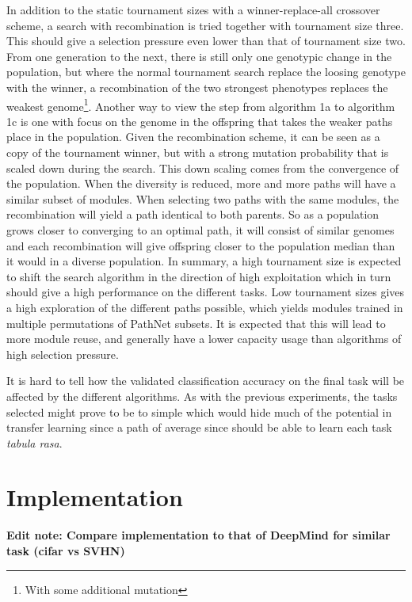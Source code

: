 In addition to the static tournament sizes with a winner-replace-all crossover scheme, a search with recombination is tried together with tournament size three.  This should give a selection pressure even lower than that of tournament size two. From one generation to the next, there is still only one genotypic change in the population, but where the normal tournament search replace the loosing genotype with the winner, a recombination of the two strongest phenotypes replaces the weakest genome\footnote{With some additional mutation}.  Another way to view the step from algorithm 1a to algorithm 1c is one with focus on the genome in the offspring that takes the weaker paths place in the population. Given the recombination scheme, it can be seen as a copy of the tournament winner, but with a strong mutation probability that is scaled down during the search. This down scaling comes from the convergence of the population. When the diversity is reduced, more and more paths will have a similar subset of modules. When selecting two paths with the same modules, the recombination will yield a path identical to both parents. So as a population grows closer to converging to an optimal path, it will consist of similar genomes and each recombination will give offspring closer to the population median than it would in a diverse population. 
In summary, a high tournament size is expected to shift the search algorithm in the direction of high exploitation which in turn should give a high performance on the different tasks. Low tournament sizes gives a high exploration of the different paths possible, which yields modules trained in multiple permutations of PathNet subsets. It is expected that this will lead to more module reuse, and generally have a lower capacity usage than algorithms of high selection pressure. 

It is hard to tell how the validated classification accuracy on the final task will be affected by the different algorithms. As with the previous experiments, the tasks selected might prove to be to simple which would hide much of the potential in transfer learning since a path of average since should be able to learn each task \textit{tabula rasa}.

\section{Implementation}
\label{exp2:implementation}

\textbf{Edit note: Compare implementation to that of DeepMind for similar task (cifar vs SVHN)}

